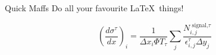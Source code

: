 \documentclass[14pt,aspectratio=169]{beamer} %
\begin{document}
\begin{frame}{Quick Maffs}
  Do all your favourite \LaTeX \ things!

  \begin{equation}
    \left(\frac{d \sigma^\tau}{dx}\right)_i = \frac{1}{\Delta x_i \Phi T_\tau} \sum_j \frac{N_{i,j}^{\text{ signal,}\tau}}{\epsilon_{i,j}^\tau \Delta y_j}
  \end{equation}
\end{frame}
\end{document}
